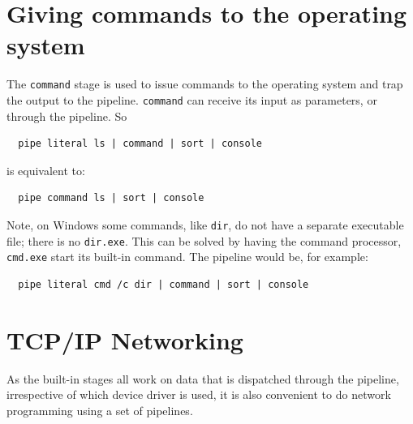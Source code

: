\section{Giving commands to the operating system}

The \texttt{command} stage is used to issue commands to the operating
system and trap the output to the pipeline. \texttt{command} can
receive its input as parameters, or through the pipeline. So
\begin{lstlisting}
  pipe literal ls | command | sort | console
\end{lstlisting}
is equivalent to:
\begin{lstlisting}
  pipe command ls | sort | console
\end{lstlisting}


Note, on Windows some commands, like \texttt{dir}, do not have a separate
executable file; there is no \texttt{dir.exe}. This can be solved by
having the command processor, \texttt{cmd.exe} start its built-in
command. The pipeline would be, for example:
\begin{lstlisting}
  pipe literal cmd /c dir | command | sort | console
\end{lstlisting}

\section{TCP/IP Networking}
As the built-in stages all work on data that is dispatched through the
pipeline, irrespective of which device driver is used, it is also
convenient to do network programming using a set of pipelines.

